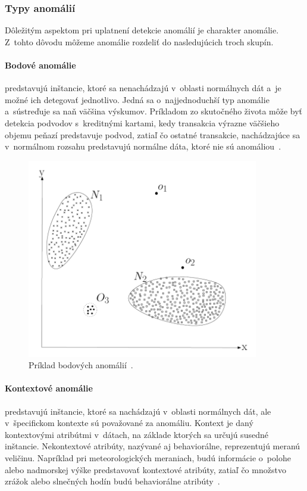 \documentclass[a4paper,twoside,slovak,12pt,appendix]{article}
\begin{document}

\subsubsection{Typy anomálií}
Dôležitým aspektom pri uplatnení detekcie anomálií je charakter anomálie.
Z~tohto dôvodu môžeme anomálie rozdeliť do nasledujúcich troch skupín.

\paragraph{Bodové anomálie} predstavujú inštancie, ktoré sa nenachádzajú
v~oblasti normálnych dát a~je možné ich detegovať jednotlivo. Jedná sa
o~najjednoduchší typ anomálie a~sústreďuje sa naň väčšina výskumov. Príkladom zo
skutočného života môže byť detekcia podvodov s~kreditnými kartami, kedy
transakcia výrazne väčšieho objemu peňazí predstavuje podvod, zatiaľ čo ostatné
transakcie, nachádzajúce sa v~normálnom rozsahu predstavujú normálne dáta, ktoré
nie sú anomáliou~\cite{Chandola2009}.

\begin{figure}[htbp]
  \centering
  \includegraphics[width=0.9\textwidth]{point_anomalies.png}
  \caption{Príklad bodových anomálií~\cite{Chandola2009}.}
  \label{fig:point-anomalies}
\end{figure}

\paragraph{Kontextové anomálie} predstavujú inštancie, ktoré sa nachádzajú
v~oblasti normálnych dát, ale v~špecifickom kontexte sú považované za anomáliu.
Kontext je daný kontextovými atribútmi v~dátach, na základe ktorých sa určujú
susedné inštancie. Nekontextové atribúty, nazývané aj behaviorálne, reprezentujú
meranú veličinu. Napríklad pri meteorologických meraniach, budú informácie
o~polohe alebo nadmorskej výške predstavovať kontextové atribúty, zatiaľ čo
množstvo zrážok alebo slnečných hodín budú behaviorálne
atribúty~\cite{Chandola2009}.
\end{document}

